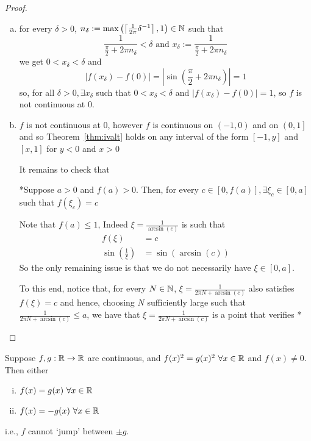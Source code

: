 \begin{proof}\text{ }
    \begin{enumerate}[(a)]
        \item for every $\delta > 0$, $n_\delta := \max\left(\left\lceil\frac{1}{2\pi}\delta^{-1}\right\rceil, 1\right)\in \mathbb N$ such that 
        $$\frac{1}{\frac{\pi}{2} + 2\pi n_\delta} < \delta\text{ and }x_\delta := \frac{1}{\frac{\pi}{2} + 2\pi n_\delta}$$
        we get $0 < x_\delta < \delta$ and 
        $$|f(x_\delta) - f(0)| = \left|\sin\left(\frac{\pi}{2} + 2\pi n_\delta\right)\right| = 1$$
        so, for all $\delta > 0, \exists x_\delta$ such that $0 < x_\delta < \delta$ and
        $|f(x_\delta) - f(0)| = 1$, so $f$ is not continuous at $0$.
        \item $f$ is not continuous at $0$, however $f$ is continuous on $(-1, 0)$ and on $\left(0, 1\right]$ and 
        so Theorem~\ref{thm:ivalt} holds on any interval of the form $\left[-1, y\right]$ and $\left[ x, 1\right]$ for 
        $y < 0$ and $x > 0$

        It remains to check that 

        *Suppose $a > 0$ and $f(a) > 0$. Then, for every $c \in \left[0, f(a)\right], \exists \xi_c\in\left[0, a\right]$ such that 
        $f(\xi_c) = c$

        Note that $f(a) \leq 1$, Indeed $\xi = \frac{1}{\arcsin(c)}$ is such that 
        \begin{align*}
            f(\xi) &= c \\
            \sin\left(\frac{1}{\xi}\right) &= \sin(\arcsin(c))
        \end{align*}
        So the only remaining issue is that we do not necessarily have $\xi \in \left[0, a\right]$.

        To this end, notice that, for every $N \in \mathbb N$, $\xi = \frac{1}{2\pi N + \arcsin(c)}$ 
        also satisfies $f(\xi) = c$ and hence, choosing $N$ sufficiently large such that $\frac{1}{2\pi N + \arcsin(c)} \leq a$, 
        we have that $\xi = \frac{1}{2\pi N + \arcsin(c)}$ is a point that verifies *
    \end{enumerate}
\end{proof}

\begin{example}
    Suppose $f, g: \mathbb R \to \mathbb R$ are continuous, and $f(x)^2 = g(x)^2\ \forall x \in \mathbb R$ and $f(x) \neq 0$. 
    Then either
    \begin{enumerate}[(i)]
        \item $f(x) = g(x)\ \forall x \in \mathbb R$
        \item $f(x) = -g(x)\ \forall x \in \mathbb R$
    \end{enumerate}
    i.e., $f$ cannot `jump' between $\pm g$.
\end{example}

